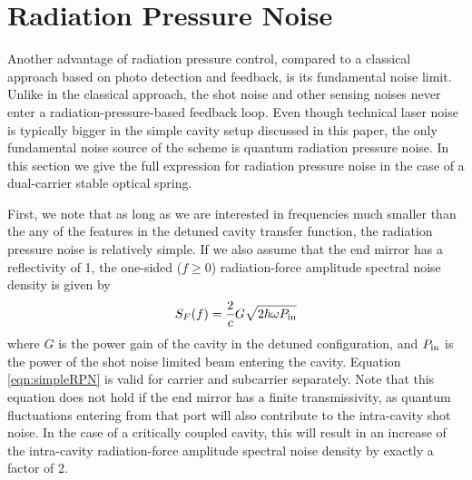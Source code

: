 
\section{Radiation Pressure Noise}
\label{sec:V}
Another advantage of radiation pressure control, compared to a classical approach based on photo detection and feedback, is its fundamental noise limit. Unlike in the classical approach, the shot noise and other sensing noises %
never enter a radiation-pressure-based feedback loop. Even though technical laser noise is typically bigger in the simple cavity setup discussed in this paper, the only fundamental noise source of the scheme is quantum radiation pressure noise. In this section we give the full expression for radiation pressure noise in the case of a dual-carrier stable optical spring.

First, we note that as long as we are interested in frequencies much smaller than the any of the features in the detuned cavity transfer function, the radiation pressure noise is relatively simple. If we also assume that the end mirror has a reflectivity of 1, the one-sided ($f\ge0$) radiation-force amplitude spectral noise density is given by
\begin{eqnarray}
\label{eqn:simpleRPN}
S_F (f) = \frac{2}{c} G \sqrt{2 \hbar \omega P_{\rm in}}
\end{eqnarray}
where $G$ is the power gain of the cavity in the detuned configuration, and $P_{\rm in}$ is the power of the shot noise limited beam entering the cavity.
Equation \ref{eqn:simpleRPN} is valid for carrier and subcarrier separately.
Note that this equation does not hold if the end mirror has a finite transmissivity, as quantum fluctuations entering from that port will also contribute to the intra-cavity shot noise. In the case of a critically coupled cavity, this will result in an increase of the intra-cavity radiation-force amplitude spectral noise density by exactly a factor of 2.

